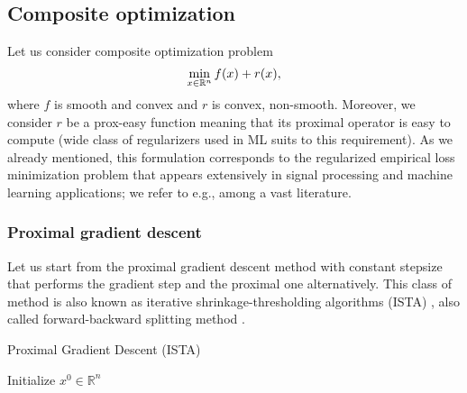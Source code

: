 \subsection{Composite optimization}\label{sec:basics_composite}
Let us consider composite optimization problem
\begin{equation}\label{eq:pb_composite}
\min_{x\in\mathbb{R}^n} f(x) + r(x),
\end{equation}
where $f$ is smooth and convex and $r$ is convex, non-smooth. Moreover, we consider $r$ be a prox-easy function meaning that its proximal operator is easy to compute (wide class of regularizers used in ML suits to this requirement). As we already mentioned, this formulation corresponds to the regularized empirical loss minimization problem that appears extensively in signal processing and machine learning applications; we refer to e.g.\;\cite{candes2008enhancing,combettes2011proximal,bach2012optimization}, among a vast literature.



\subsubsection{Proximal gradient descent}
Let us start from the proximal gradient descent method with constant stepsize that performs the gradient step and the proximal one alternatively. This class of method is also known as iterative shrinkage-thresholding algorithms (ISTA) \cite{daubechies2004iterative}, also called forward-backward splitting method \cite{gabay1983chapter, combettes2011proximal, raguet2013generalized}.

\begin{algorithm}
    \caption{Proximal Gradient Descent (ISTA)}
    \label{algo:pgd}
    \begin{algorithmic}
        \STATE Initialize $x^0\in\mathbb{R}^n$
        \ENDFOR
    \end{algorithmic}
\end{algorithm}

